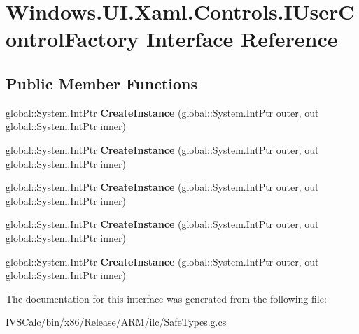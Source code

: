 \hypertarget{interface_windows_1_1_u_i_1_1_xaml_1_1_controls_1_1_i_user_control_factory}{}\section{Windows.\+U\+I.\+Xaml.\+Controls.\+I\+User\+Control\+Factory Interface Reference}
\label{interface_windows_1_1_u_i_1_1_xaml_1_1_controls_1_1_i_user_control_factory}
\subsection*{Public Member Functions}
\begin{DoxyCompactItemize}
\item 
\mbox{\label{interface_windows_1_1_u_i_1_1_xaml_1_1_controls_1_1_i_user_control_factory_a4f8bcd1e74b658849031af672cd9489d}} 
global\+::\+System.\+Int\+Ptr {\bfseries Create\+Instance} (global\+::\+System.\+Int\+Ptr outer, out global\+::\+System.\+Int\+Ptr inner)
\item 
\mbox{\label{interface_windows_1_1_u_i_1_1_xaml_1_1_controls_1_1_i_user_control_factory_a4f8bcd1e74b658849031af672cd9489d}} 
global\+::\+System.\+Int\+Ptr {\bfseries Create\+Instance} (global\+::\+System.\+Int\+Ptr outer, out global\+::\+System.\+Int\+Ptr inner)
\item 
\mbox{\label{interface_windows_1_1_u_i_1_1_xaml_1_1_controls_1_1_i_user_control_factory_a4f8bcd1e74b658849031af672cd9489d}} 
global\+::\+System.\+Int\+Ptr {\bfseries Create\+Instance} (global\+::\+System.\+Int\+Ptr outer, out global\+::\+System.\+Int\+Ptr inner)
\item 
\mbox{\label{interface_windows_1_1_u_i_1_1_xaml_1_1_controls_1_1_i_user_control_factory_a4f8bcd1e74b658849031af672cd9489d}} 
global\+::\+System.\+Int\+Ptr {\bfseries Create\+Instance} (global\+::\+System.\+Int\+Ptr outer, out global\+::\+System.\+Int\+Ptr inner)
\item 
\mbox{\label{interface_windows_1_1_u_i_1_1_xaml_1_1_controls_1_1_i_user_control_factory_a4f8bcd1e74b658849031af672cd9489d}} 
global\+::\+System.\+Int\+Ptr {\bfseries Create\+Instance} (global\+::\+System.\+Int\+Ptr outer, out global\+::\+System.\+Int\+Ptr inner)
\end{DoxyCompactItemize}


The documentation for this interface was generated from the following file\+:\begin{DoxyCompactItemize}
\item 
I\+V\+S\+Calc/bin/x86/\+Release/\+A\+R\+M/ilc/Safe\+Types.\+g.\+cs\end{DoxyCompactItemize}
